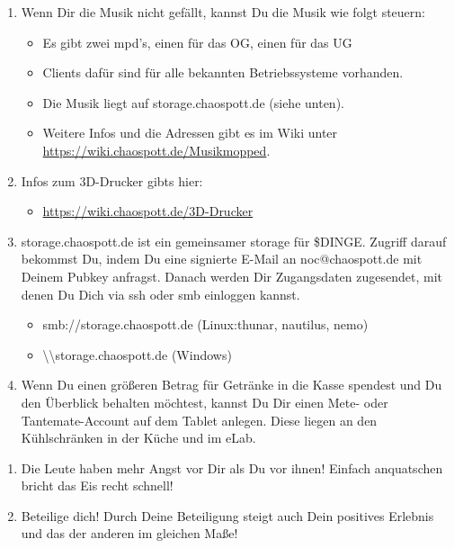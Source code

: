 \begin{enumerate}
	\item Wenn Dir die Musik nicht gefällt, kannst Du die Musik wie folgt steuern:
		\begin{itemize}
		  \item Es gibt zwei mpd's, einen für das OG, einen für das UG
		  \item Clients dafür sind für alle bekannten Betriebssysteme vorhanden.
		  \item Die Musik liegt auf storage.chaospott.de (siehe unten).
		  \item Weitere Infos und die Adressen gibt es im Wiki unter \url{https://wiki.chaospott.de/Musikmopped}.
		\end{itemize}
	\item Infos zum 3D-Drucker gibts hier: 
		\begin{itemize}
		  \item \url{https://wiki.chaospott.de/3D-Drucker}
		\end{itemize}
	\item storage.chaospott.de ist ein gemeinsamer storage für \$DINGE. Zugriff darauf bekommst Du, indem Du eine signierte E-Mail an noc@chaospott.de mit Deinem Pubkey anfragst. Danach werden Dir Zugangsdaten zugesendet, mit denen Du Dich via ssh oder smb einloggen kannst. 
		\begin{itemize}
		  \item smb://storage.chaospott.de (Linux:thunar, nautilus, nemo)
		  \item \textbackslash\textbackslash storage.chaospott.de (Windows)
		\end{itemize}
	\item Wenn Du einen größeren Betrag für Getränke in die Kasse spendest und Du den Überblick behalten möchtest, kannst Du Dir einen Mete- oder Tantemate-Account auf dem Tablet anlegen. Diese liegen an den Kühlschränken in der Küche und im eLab.
	\end{enumerate}
	\begin{adjustwidth}{0.1cm}{1.5cm} 
		\begin{enumerate}[resume]
			\item Die Leute haben mehr Angst vor Dir als Du vor ihnen! Einfach anquatschen bricht das Eis recht schnell!
			\item Beteilige dich! Durch Deine Beteiligung steigt auch Dein positives Erlebnis und das der anderen im gleichen Maße!
		\end{enumerate}
	\end{adjustwidth}

